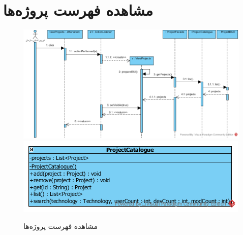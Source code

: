 \section{مشاهده فهرست پروژه‌ها}
\begin{figure}[H]
	\centering
	\includegraphics[scale=1]{img/sequence-design/ViewListOfProjects}
	\includegraphics[scale=1]{img/sequence-design/ViewListOfProjectsC}
	\caption{مشاهده فهرست پروژه‌ها}
\end{figure}


